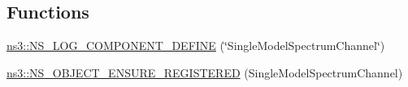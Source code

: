 \subsection*{Functions}
\begin{DoxyCompactItemize}
\item 
\hyperlink{namespacens3_ada02db24d2d913f8dd99c90e8b4cccab}{ns3\+::\+N\+S\+\_\+\+L\+O\+G\+\_\+\+C\+O\+M\+P\+O\+N\+E\+N\+T\+\_\+\+D\+E\+F\+I\+NE} (\char`\"{}Single\+Model\+Spectrum\+Channel\char`\"{})
\item 
\hyperlink{namespacens3_ac6cda1b772893effa0a325e36ac60874}{ns3\+::\+N\+S\+\_\+\+O\+B\+J\+E\+C\+T\+\_\+\+E\+N\+S\+U\+R\+E\+\_\+\+R\+E\+G\+I\+S\+T\+E\+R\+ED} (Single\+Model\+Spectrum\+Channel)
\end{DoxyCompactItemize}
